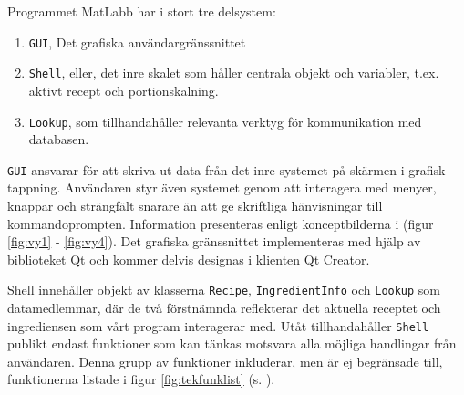 Programmet MatLabb har i stort tre delsystem:

\begin{enumerate}
\item \verb+GUI+, Det grafiska användargränssnittet
\item \verb+Shell+, eller, det inre skalet som håller centrala objekt och variabler, t.ex. aktivt recept och portionskalning.
\item \verb+Lookup+, som tillhandahåller relevanta verktyg för kommunikation med databasen.
\end{enumerate}
\verb+GUI+ ansvarar för att skriva ut data från det inre systemet på skärmen i grafisk tappning. Användaren styr även systemet genom att interagera med menyer, knappar och strängfält snarare än att ge skriftliga hänvisningar till kommandoprompten. Information presenteras enligt konceptbilderna i (figur \ref{fig:vy1} - \ref{fig:vy4}). Det grafiska gränssnittet implementeras med hjälp av biblioteket Qt och kommer delvis designas i klienten Qt Creator.

Shell innehåller objekt av klasserna \verb+Recipe+, \verb+IngredientInfo+ och \verb+Lookup+ som datamedlemmar, där de två förstnämnda reflekterar det aktuella receptet och ingrediensen som vårt program interagerar med. Utåt tillhandahåller \verb+Shell+ publikt endast funktioner som kan tänkas motsvara alla möjliga handlingar från användaren. Denna grupp av funktioner inkluderar, men är ej begränsade till, funktionerna listade i figur \ref{fig:tekfunklist} (s. \pageref{fig:tekfunklist}).

